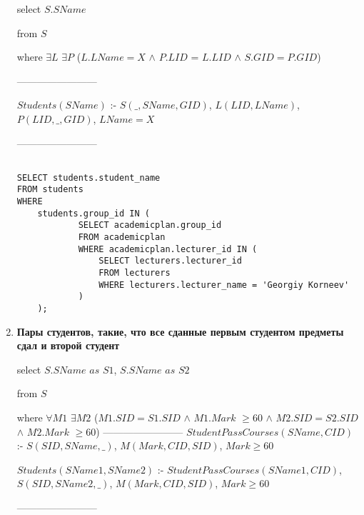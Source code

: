 \documentclass[12pt]{article}
\begin{document}
\begin{enumerate}
            	select   $S.SName$  
     		
     		from   $S$   
     		
     		where   $\exists L$ $\exists P$ ($L.LName = X$ $\wedge$ $P.LID$ = $L.LID$ $\wedge$ $S.GID = P.GID$)
    
		------------------------
     		
     		$Students(SName)$ :- $S(\_, SName, GID)$, $L(LID, LName)$, $P(LID, \_, GID)$, $LName = X$

		------------------------     		
            
		\begin{verbatim}
		
SELECT students.student_name
FROM students 
WHERE 
	students.group_id IN (
			SELECT academicplan.group_id 
			FROM academicplan
			WHERE academicplan.lecturer_id IN (
				SELECT lecturers.lecturer_id
				FROM lecturers
				WHERE lecturers.lecturer_name = 'Georgiy Korneev'
			)			
	);
		\end{verbatim}

        
    \item \textbf{Пары студентов, такие, что все сданные первым студентом предметы сдал и второй студент}
    
            	select   $S.SName$ $as$ $S1$, $S.SName$ $as$ $S2$  
     		
     		from   $S$   
     		
     		where   $\forall M1$ $\exists M2$ ($M1.SID = S1.SID$ $\wedge$ $M1.Mark$ $\ge 60$ $\wedge$ $M2.SID = S2.SID$ $\wedge$ $M2.Mark$ $\ge 60$)
		------------------------
     		$StudentPassCourses(SName, CID)$ :- $S(SID, SName, \_)$, $M(Mark, CID, SID)$, $Mark \ge 60$
     		
     		$Students(SName1, SName2)$ :- $StudentPassCourses(SName1, CID)$, $S(SID, SName2, \_)$,  $M(Mark, CID, SID)$, $Mark \ge 60$

		------------------------     		
            
	

        
\end{enumerate}    
\end{document}
